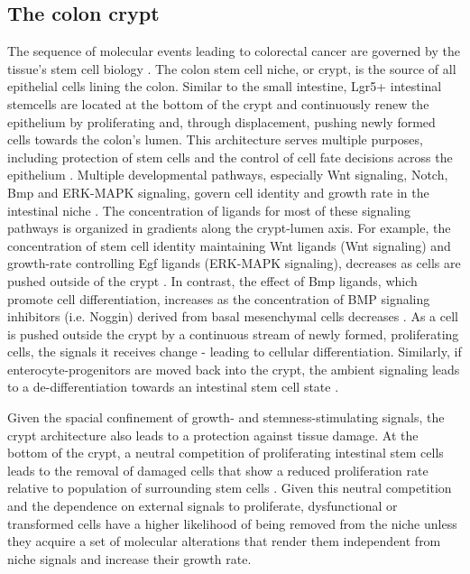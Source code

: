 \begin{flushleft}
\subsection{The colon crypt}
The sequence of molecular events leading to colorectal cancer are governed by the tissue's stem cell biology \citep{cleversCancerStemCell2011}. The colon stem cell niche, or crypt, is the source of all epithelial cells lining the colon. Similar to the small intestine, Lgr5+ intestinal stemcells are located at the bottom of the crypt and continuously renew the epithelium by proliferating and, through displacement, pushing newly formed cells towards the colon's lumen. This architecture serves multiple purposes, including protection of stem cells and the control of cell fate decisions across the epithelium \citep{cleversIntestinalCryptPrototype2013a}. Multiple developmental pathways, especially Wnt signaling, Notch, Bmp and ERK-MAPK signaling, govern cell identity and growth rate in the intestinal niche \citep{hTalesCryptNew2019}. The concentration of ligands for most of these signaling pathways is organized in gradients along the crypt-lumen axis. For example, the concentration of stem cell identity maintaining Wnt ligands (Wnt signaling) and growth-rate controlling Egf ligands (ERK-MAPK signaling), decreases as cells are pushed outside of the crypt \citep{sasakiReg4DeepCrypt2016}. In contrast, the effect of Bmp ligands, which promote cell differentiation, increases as the concentration of BMP signaling inhibitors (i.e. Noggin) derived from basal mesenchymal cells decreases \citep{heBMPSignalingInhibits2004}. As a cell is pushed outside the crypt by a continuous stream of newly formed, proliferating cells, the signals it receives change - leading to cellular differentiation. Similarly, if enterocyte-progenitors are moved back into the crypt, the ambient signaling leads to a de-differentiation towards an intestinal stem cell state \citep{tettehReplacementLostLgr5Positive2016a}. \par

Given the spacial confinement of growth- and stemness-stimulating signals, the crypt architecture also leads to a protection against tissue damage. At the bottom of the crypt, a neutral competition of proliferating intestinal stem cells leads to the removal of damaged cells that show a reduced proliferation rate relative to population of surrounding stem cells \citep{snippertIntestinalCryptHomeostasis2010a}. Given this neutral competition and the dependence on external signals to proliferate, dysfunctional or transformed cells have a higher likelihood of being removed from the niche unless they acquire a set of molecular alterations that render them independent from niche signals and increase their growth rate. \par


\end{flushleft}

